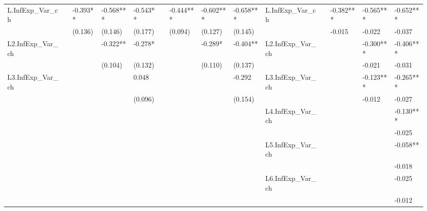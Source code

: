 \documentclass[]{article}
\begin{document}
\begin{table}
\begin{adjustbox}{width={24cm},totalheight={14cm},angle=90}
\begin{tabular}{llllllllllllll}
		\hline 
		L.InfExp\_Var\_ch    &             & -0.393**  & -0.568*** & -0.543**  &               & -0.444*** & -0.602*** & -0.658*** & L.InfExp\_Var\_ch    &               & -0.382*** & -0.565*** & -0.652*** \\
		&             & (0.136)   & (0.146)   & (0.177)   &               & (0.094)   & (0.127)   & (0.145)   &                      &               & -0.015    & -0.022    & -0.037    \\
		L2.InfExp\_Var\_ch   &             &           & -0.322**  & -0.278*   &               &           & -0.289*   & -0.404**  & L2.InfExp\_Var\_ch   &               &           & -0.300*** & -0.406*** \\
		&             &           & (0.104)   & (0.132)   &               &           & (0.110)   & (0.137)   &                      &               &           & -0.021    & -0.031    \\
		L3.InfExp\_Var\_ch   &             &           &           & 0.048     &               &           &           & -0.292    & L3.InfExp\_Var\_ch   &               &           & -0.123*** & -0.265*** \\
		&             &           &           & (0.096)   &               &           &           & (0.154)   &                      &               &           & -0.012    & -0.027    \\
		&             &           &           &           &               &           &           &           & L4.InfExp\_Var\_ch   &               &           &           & -0.130*** \\
		&             &           &           &           &               &           &           &           &                      &               &           &           & -0.025    \\
		&             &           &           &           &               &           &           &           & L5.InfExp\_Var\_ch   &               &           &           & -0.058**  \\
		&             &           &           &           &               &           &           &           &                      &               &           &           & -0.018    \\
		&             &           &           &           &               &           &           &           & L6.InfExp\_Var\_ch   &               &           &           & -0.025    \\
		&             &           &           &           &               &           &           &           &                      &               &           &           & -0.012    \\

\end{tabular}
\end{adjustbox}
\end{table}
\end{document}
